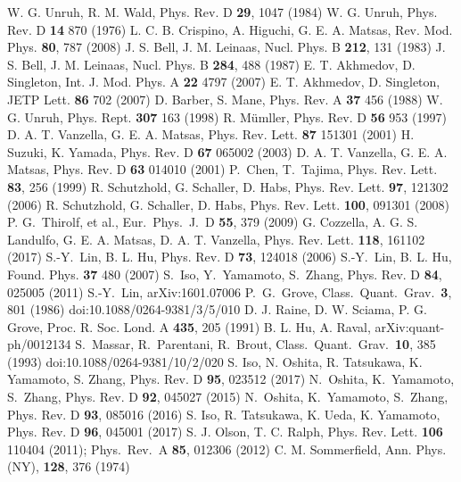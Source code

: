 \documentclass[aps,prd,preprintnumbers,nofootinbib,showpacs]{revtex4}%
\begin{document}
\begin{widetext}
\begin{thebibliography}{99}
W. G. Unruh, R. M. Wald, Phys. Rev. D {\bf 29}, 1047 (1984)
W. G. Unruh, Phys. Rev. D {\bf 14} 870 (1976)
L. C. B. Crispino, A. Higuchi, G. E. A. Matsas, Rev. Mod. Phys. {\bf 80}, 787 (2008)
J. S. Bell, J. M. Leinaas, Nucl. Phys. B {\bf 212}, 131 (1983)
J. S. Bell, J. M. Leinaas, Nucl. Phys. B {\bf 284}, 488 (1987)
E. T. Akhmedov, D. Singleton, Int. J. Mod. Phys. A {\bf 22} 4797 (2007)
E. T. Akhmedov, D. Singleton, JETP Lett. {\bf 86} 702 (2007)
D. Barber, S. Mane, Phys. Rev. A {\bf 37} 456 (1988)
W. G. Unruh, Phys. Rept. {\bf 307} 163 (1998)
R. M\"umller, Phys. Rev. D {\bf 56} 953 (1997)
D. A. T. Vanzella, G. E. A. Matsas, Phys. Rev. Lett. {\bf 87} 151301 (2001)
 H. Suzuki, K. Yamada, Phys. Rev. D {\bf 67} 065002 (2003)
D. A. T. Vanzella, G. E. A. Matsas, Phys. Rev. D {\bf 63} 014010 (2001)
  P.~Chen, T.~Tajima,
  Phys. Rev. Lett. {\bf 83}, 256 (1999) 
R. Schutzhold, G. Schaller, D. Habs, Phys. Rev. Lett. {\bf 97}, 121302 (2006)
R. Schutzhold, G. Schaller, D. Habs, Phys. Rev. Lett. {\bf 100}, 091301 (2008)
  P. G.~Thirolf, et al., 
  Eur.\ Phys.\ J.\ D {\bf 55}, 379 (2009)
G. Cozzella, A. G. S. Landulfo, G. E. A. Matsas, D. A. T. Vanzella, 
Phys. Rev. Lett. {\bf 118}, 161102 (2017)
S.-Y.~Lin, B. L. Hu, Phys. Rev. D {\bf73}, 124018 (2006)
S.-Y.~Lin, B. L. Hu, Found. Phys. {\bf 37} 480 (2007)
 S.~Iso, Y.~Yamamoto, S.~Zhang, Phys. Rev. D {\bf 84}, 025005 (2011)
S.-Y.~Lin, arXiv:1601.07006
 P.~G.~Grove,
  Class.\ Quant.\ Grav.\  {\bf 3}, 801 (1986)
  doi:10.1088/0264-9381/3/5/010
 D. J. Raine, D. W. Sciama, P. G. Grove, Proc. R. Soc. Lond. A {\bf 435}, 205 (1991)
  B. L. Hu, A. Raval, arXiv:quant-ph/0012134
 S.~Massar, R.~Parentani, R.~Brout,
  Class.\ Quant.\ Grav.\  {\bf 10}, 385 (1993)
  doi:10.1088/0264-9381/10/2/020
S. Iso, N. Oshita, R. Tatsukawa, K. Yamamoto, S. Zhang, Phys. Rev. D {\bf 95}, 023512 (2017) 
 N.~Oshita, K.~Yamamoto, S.~Zhang, Phys. Rev. D {\bf 92}, 045027 (2015)
 N.~Oshita, K.~Yamamoto, S.~Zhang, Phys. Rev. D {\bf 93}, 085016 (2016) 
S. Iso, R. Tatsukawa, K. Ueda, K. Yamamoto, Phys. Rev. D {\bf 96}, 045001 (2017)
S. J. Olson, T. C. Ralph, Phys. Rev. Lett. {\bf 106} 110404 (2011); Phys.\ Rev.\ A {\bf 85}, 012306 (2012)
C. M. Sommerfield, Ann. Phys. (NY), {\bf 128}, 376 (1974)


\end{thebibliography}
\end{widetext}
\end{document}

